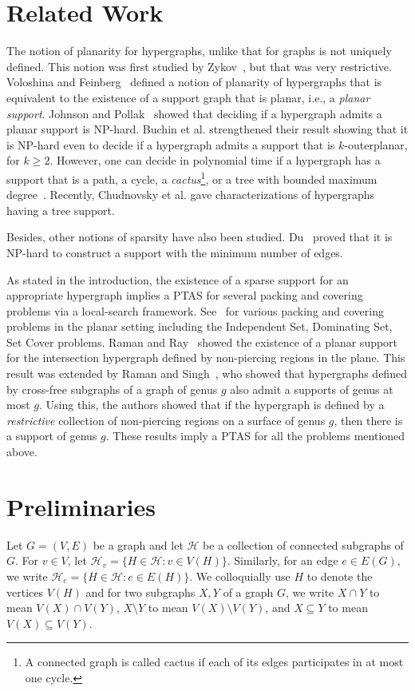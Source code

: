 \documentclass[12pt]{article}
\theoremstyle{case}
\begin{document}
\section{Related Work}\label{sec:relwrk}
The notion of planarity for hypergraphs, unlike that for graphs
is not uniquely defined. This notion was first studied by
Zykov~\cite{zykov}, but that was very restrictive.
Voloshina and Feinberg~\cite{voloshina1984planarity}
defined a notion of planarity of hypergraphs that is equivalent to
the existence of a support graph that is planar, i.e., a \emph{planar support}.
Johnson and Pollak~\cite{Johnson1987Hypergraph} showed that deciding if a hypergraph
admits a planar support is NP-hard.
Buchin et al. \cite{buchin2011planar} strengthened their result
showing that it is NP-hard even to decide if a hypergraph admits a support
that is  $k$-outerplanar, for $k\ge 2$.
However, one can decide in polynomial time if a hypergraph has a support that is a path, a cycle, a \emph{cactus}\footnote{A connected graph is called cactus if each of its edges participates in at most one cycle.}, or a tree with bounded maximum degree~\cite{beeri,BOOTH1976335,brandes2010blocks,buchin2011planar,tarjan1984simple}.
Recently, Chudnovsky et al. \cite{chudnovsky2025vertex} gave characterizations of hypergraphs having a tree support.

Besides, other notions of sparsity have also been studied.
Du~\cite{du1986optimization} proved that it is NP-hard to construct a support with the minimum number of edges.

As stated in the introduction, the existence of a sparse support for an appropriate
hypergraph implies a PTAS for several packing and covering problems via a
local-search framework. See~\cite{BasuRoy2018,ChanH12,mustafa2010improved} for various packing and covering problems in the planar setting including the Independent Set, Dominating Set, Set Cover problems. 
Raman and Ray~\cite{RR18} showed the existence of a planar support for the intersection hypergraph defined by non-piercing regions in the plane. This result
was extended by Raman and Singh~\cite{raman2025supportsgraphsboundedgenus}, who showed that
hypergraphs defined by
cross-free subgraphs of a graph of genus $g$ also admit a supports of genus at most $g$.
Using this, the authors showed that if the hypergraph is defined by a \emph{restrictive} collection of non-piercing regions on a surface of genus $g$, then there is a support of genus $g$.
These results imply a PTAS for all the problems mentioned above.

\section{Preliminaries}\label{sec:prelim}
Let $G=(V,E)$ be a graph and let $\mathcal{H}$ be a collection of 
connected subgraphs of $G$. For $v\in V$, 
let $\mathcal{H}_v=\{H\in\mathcal{H}:v\in V(H)\}$.
Similarly, for an edge $e\in E(G)$, 
we write $\mathcal{H}_{e}=\{H\in\mathcal{H}:e\in E(H)\}$.
We colloquially use $H$ to denote the vertices $V(H)$ and
for two subgraphs $X,Y$ of a graph $G$, we write $X\cap Y$ to mean $V(X)\cap V(Y)$, $X\setminus Y$ to mean $V(X)\setminus V(Y)$, and $X\subseteq Y$ to mean $V(X)\subseteq V(Y)$.
\end{document}
